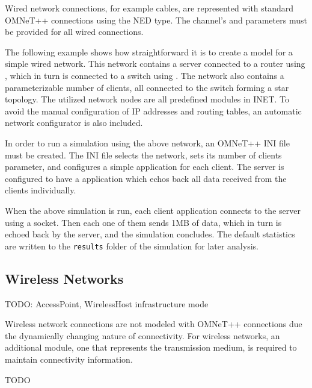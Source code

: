 Wired network connections, for example  cables, are
represented with standard OMNeT++ connections using the
 NED type. The channel's  and
 parameters must be provided for all wired connections.

The following example shows how straightforward it is to create a model for
a simple wired network. This network contains a server connected to a router
using , which in turn is connected to a switch using
. The network also contains a parameterizable number of
clients, all connected to the switch forming a star topology. The utilized
network nodes are all predefined modules in INET. To avoid the manual
configuration of IP addresses and routing tables, an automatic network
configurator is also included.


In order to run a simulation using the above network, an OMNeT++ INI file must
be created. The INI file selects the network, sets its number of clients
parameter, and configures a simple  application for each
client. The server is configured to have a  application which
echos back all data received from the clients individually.


When the above simulation is run, each client application connects to the
server using a  socket. Then each one of them sends 1MB of
data, which in turn is echoed back by the server, and the simulation
concludes. The default statistics are written to the \texttt{results}
folder of the simulation for later analysis.

\subsection{Wireless Networks}

TODO: AccessPoint, WirelessHost infrastructure mode

Wireless network connections are not modeled with OMNeT++ connections due the
dynamically changing nature of connectivity. For wireless networks, an
additional module, one that represents the transmission medium, is required to
maintain connectivity information.

TODO 


